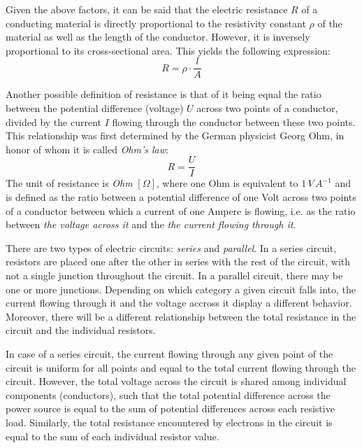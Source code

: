 Given the above factors, it can be said that the electric resistance $R$ of a conducting material is directly proportional to the resistivity constant $\rho$ of the material as well as the length of the conductor. However, it is inversely proportional to its cross-sectional area. This yields the following expression: $$R = \rho \cdot \frac{l}{A}$$

\pagebreak

Another possible definition of resistance is that of it being equal the ratio between the potential difference (voltage) $U$ across two points of a conductor, divided by the current $I$ flowing through the conductor between these two points. This relationship was first determined by the German physicist Georg Ohm, in honor of whom it is called \emph{Ohm's law}: $$R = \frac{U}{I}$$ The unit of resistance is \emph{Ohm} $[\Omega]$, where one Ohm is equivalent to $1\, V\, A^{-1}$ and is defined as the ratio between a potential difference of one Volt across two points of a conductor between which a current of one Ampere is flowing, i.e. as the ratio between \emph{the voltage across it} and the \emph{the current flowing through it}.


There are two types of electric circuits: \emph{series} and \emph{parallel}. In a series circuit, resistors are placed one after the other in series with the rest of the circuit, with not a single junction throughout the circuit. In a parallel circuit, there may be one or more junctions. Depending on which category a given circuit falls into, the current flowing through it and the voltage accross it display a different behavior. Moreover, there will be a different relationship between the total resistance in the circuit and the individual resistors.


In case of a series circuit, the current flowing through any given point of the circuit is uniform for all points and equal to the total current flowing through the circuit. However, the total voltage across the circuit is shared among individual components (conductors), such that the total potential difference across the power source is equal to the sum of potential differences across each resistive load. Similarly, the total resistance encountered by electrons in the circuit is equal to the sum of each individual resistor value.

